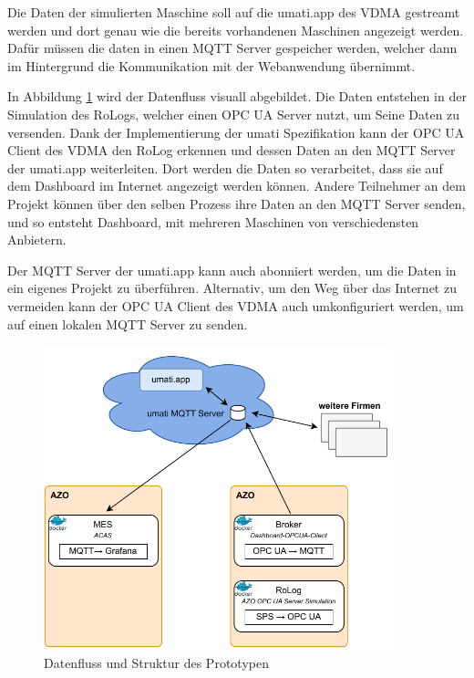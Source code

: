 \documentclass[a4paper, 12pt, oneside]{scrbook}
\begin{document}
		Die Daten der simulierten Maschine soll auf die umati.app des VDMA gestreamt werden und dort genau wie die bereits vorhandenen Maschinen angezeigt werden. Dafür müssen die daten in einen \ac{MQTT} Server gespeicher werden, welcher dann im Hintergrund die Kommunikation mit der Webanwendung übernimmt. 
		
		In Abbildung \ref{fig:umati.app} wird der Datenfluss visuall abgebildet. Die Daten entstehen in der Simulation des RoLogs, welcher einen OPC UA Server nutzt, um Seine Daten zu versenden. Dank der Implementierung der umati Spezifikation kann der OPC UA Client des VDMA den  RoLog erkennen und dessen Daten an den \ac{MQTT} Server der umati.app weiterleiten. Dort werden die Daten so verarbeitet, dass sie auf dem Dashboard im Internet angezeigt werden können. Andere Teilnehmer an dem Projekt können über den selben Prozess ihre Daten an den \ac{MQTT} Server senden, und so entsteht Dashboard, mit mehreren Maschinen von verschiedensten Anbietern.
		
		Der MQTT Server der umati.app kann auch abonniert werden, um die Daten in ein eigenes Projekt zu überführen. Alternativ, um den Weg über das Internet zu vermeiden kann der OPC UA Client des VDMA auch umkonfiguriert werden, um auf einen lokalen \ac{MQTT} Server zu senden. 
		
		\begin{figure}[H]
			\centering
			\includegraphics[width=0.9\textwidth]{res/umatiAppStruktur.pdf}
			\caption{Datenfluss und Struktur des Prototypen}
			\label{fig:umati.app}
		\end{figure}
		
\end{document}
